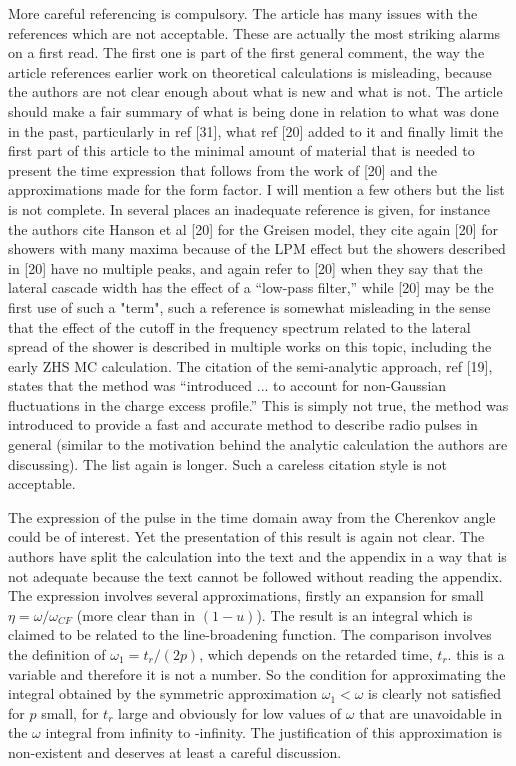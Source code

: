 \documentclass[12pt]{article}
\begin{document}
More careful referencing is compulsory. The article has many issues with the references which are not
acceptable. These are actually the most striking alarms on a first read. The first one is part of the first general comment, the way the article references earlier work on theoretical calculations is
misleading, because the authors are not clear enough about what is new and what is not. The article should make a fair summary of what is being done in relation to what was done in the past, particularly in
ref [31], what ref [20] added to it and finally limit the first part of this article to the minimal amount of material that is needed to present the time expression that follows from the work of [20] and the
approximations made for the form factor. I will mention a few others but the list is not complete.
In several places an inadequate reference is given, for instance the authors cite Hanson et al [20] for the Greisen model, they cite again [20] for showers with many maxima because of the LPM effect but the
showers described in [20] have no multiple peaks, and again refer to [20] when they say that the lateral cascade width has the effect of a ``low-pass filter,'' while [20] may be the first use of such a "term",
such a reference is somewhat misleading in the sense that the effect of the cutoff in the frequency spectrum related to the lateral spread of the shower is described in multiple works on this topic, including the early ZHS MC calculation. The citation of the semi-analytic approach, ref [19], states that the method was ``introduced ... to account for non-Gaussian fluctuations in the charge excess profile.''
This is simply not true, the method was introduced to provide a fast and accurate method to describe radio pulses in general (similar to the motivation behind the analytic calculation the authors are discussing). The list again is longer. Such a careless citation style is not acceptable.

The expression of the pulse in the time domain away from the Cherenkov angle could be of interest. Yet the presentation of this result is again not clear. The authors have split the calculation into the text
and the appendix in a way that is not adequate because the text cannot be followed without reading the appendix. The expression involves several approximations, firstly an expansion for small $\eta=\omega/\omega_{CF}$ (more clear than in $(1-u)$). The result is an integral which is claimed to be related to the line-broadening function. The comparison involves the definition of $\omega_1=t_r/(2p)$, which depends on the retarded time, $t_r$. this is a variable and therefore it is not a number. So the condition for approximating the integral obtained by the symmetric approximation $\omega_1<\omega$ is clearly not satisfied for $p$ small, for $t_r$ large and obviously for low values of $\omega$ that are unavoidable in the $\omega$ integral from infinity to -infinity. The justification of this approximation is non-existent and deserves at least a careful discussion. 
\end{document}
